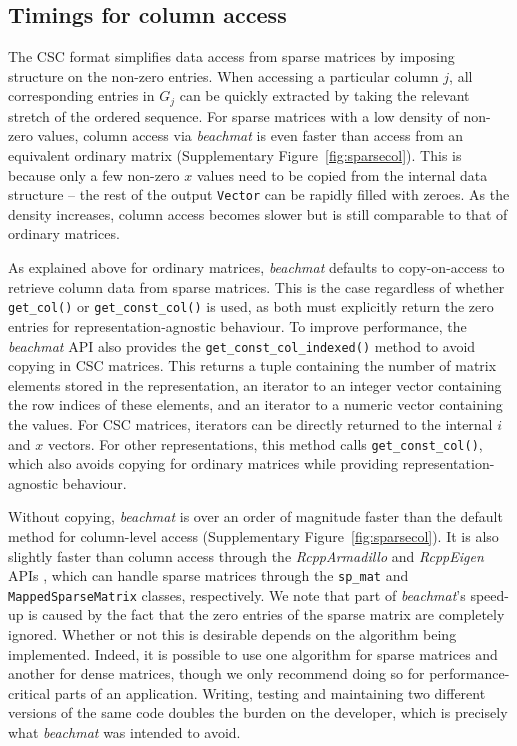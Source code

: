 \documentclass{article}
\newcommand{\beachmat}{\textit{beachmat}}
\newcommand{\code}[1]{\texttt{#1}}
\begin{document}
\subsection{Timings for column access}
The CSC format simplifies data access from sparse matrices by imposing structure on the non-zero entries.
When accessing a particular column $j$, all corresponding entries in $G_j$ can be quickly extracted by taking the relevant stretch of the ordered sequence.
For sparse matrices with a low density of non-zero values, column access via \beachmat{} is even faster than access from an equivalent ordinary matrix (Supplementary Figure~\ref{fig:sparsecol}).
This is because only a few non-zero $x$ values need to be copied from the internal data structure -- the rest of the output \code{Vector} can be rapidly filled with zeroes.
As the density increases, column access becomes slower but is still comparable to that of ordinary matrices.

As explained above for ordinary matrices, \beachmat{} defaults to copy-on-access to retrieve column data from sparse matrices.
This is the case regardless of whether \code{get\_col()} or \code{get\_const\_col()} is used, as both must explicitly return the zero entries for representation-agnostic behaviour.
To improve performance, the \beachmat{} API also provides the \code{get\_const\_col\_indexed()} method to avoid copying in CSC matrices.
This returns a tuple containing the number of matrix elements stored in the representation, an iterator to an integer vector containing the row indices of these elements, and an iterator to a numeric vector containing the values.
For CSC matrices, iterators can be directly returned to the internal $i$ and $x$ vectors.
For other representations, this method calls \code{get\_const\_col()}, which also avoids copying for ordinary matrices while providing representation-agnostic behaviour.

Without copying, \beachmat{} is over an order of magnitude faster than the default method for column-level access (Supplementary Figure~\ref{fig:sparsecol}).
It is also slightly faster than column access through the \textit{RcppArmadillo} and \textit{RcppEigen} APIs \cite{eddelbuettel2014arma,bates2013fast}, which can handle sparse matrices through the \code{sp\_mat} and \code{MappedSparseMatrix} classes, respectively.
We note that part of \beachmat{}'s speed-up is caused by the fact that the zero entries of the sparse matrix are completely ignored.
Whether or not this is desirable depends on the algorithm being implemented.
Indeed, it is possible to use one algorithm for sparse matrices and another for dense matrices, though we only recommend doing so for performance-critical parts of an application.
Writing, testing and maintaining two different versions of the same code doubles the burden on the developer, which is precisely what \beachmat{} was intended to avoid.
\end{document}
